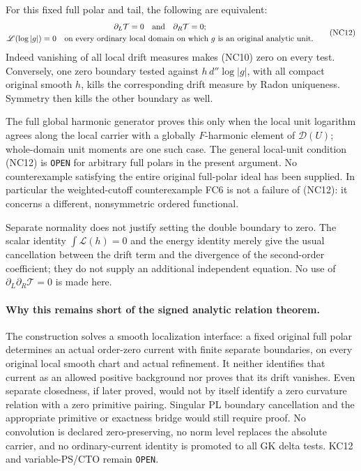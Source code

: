 For this fixed full polar and tail, the following are equivalent:
\[
 \begin{gathered}
 \partial_L\mathcal T=0\quad\hbox{and}\quad\partial_R\mathcal T=0;\\
 \mathscr L(\log|g|)=0\quad\hbox{on every ordinary local domain
 on which }g\hbox{ is an original analytic unit}.
 \end{gathered}
 \tag{NC12}
\]
Indeed vanishing of all local drift measures makes (NC10) zero on
every test.  Conversely, one zero boundary tested against
\(h\,d''\log|g|\), with all compact original smooth \(h\), kills
the corresponding drift measure by Radon uniqueness.  Symmetry then
kills the other boundary as well.

The full global harmonic generator proves this only when the local
unit logarithm agrees along the local carrier with a globally
\(F\)-harmonic element of \(\mathcal D(U)\); whole-domain unit
moments are one such case.  The general local-unit condition (NC12)
is \texttt{OPEN} for arbitrary full polars in the present argument.
No counterexample satisfying the entire original full-polar ideal has
been supplied.  In particular the weighted-cutoff counterexample FC6
is not a failure of (NC12): it concerns a different, nonsymmetric
ordered functional.

Separate normality does not justify setting the double boundary to
zero.  The scalar identity \(\int\mathscr L(h)=0\) and the
energy identity merely give the usual cancellation between the drift
term and the divergence of the second-order coefficient; they do not
supply an additional independent equation.  No use of
\(\partial_L\partial_R\mathcal T=0\) is made here.

\paragraph{Why this remains short of the signed analytic relation theorem.}
The construction solves a smooth localization interface: a fixed
original full polar determines an actual order-zero current with
finite separate boundaries, on every original local smooth chart and
actual refinement.  It neither identifies that current as an allowed
positive background nor proves that its drift vanishes.  Even
separate closedness, if later proved, would not by itself identify a
zero curvature relation with a zero primitive pairing.  Singular
PL boundary cancellation and the appropriate primitive or exactness
bridge would still require proof.  No convolution is declared
zero-preserving, no norm level replaces the absolute carrier, and
no ordinary-current identity is promoted to all GK delta tests.
KC12 and variable-PS/CTO remain \texttt{OPEN}.

